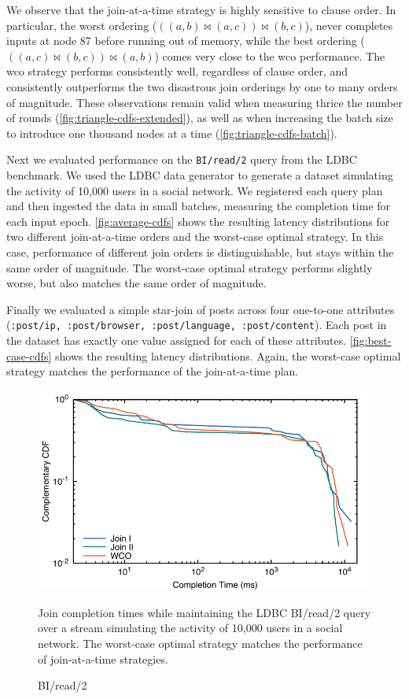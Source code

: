 \documentclass[../catalog.tex]{subfiles}
\begin{document}
We observe that the join-at-a-time strategy is highly sensitive to
clause order. In particular, the worst ordering ($((a,b) \bowtie
(a,c)) \bowtie (b,c)$), never completes inputs at node 87 before
running out of memory, while the best ordering ($((a,c) \bowtie (b,c))
\bowtie (a,b)$) comes very close to the wco performance. The wco
strategy performs consistently well, regardless of clause order, and
consistently outperforms the two disastrous join orderings by one to
many orders of magnitude. These observations remain valid when
measuring thrice the number of rounds
(\autoref{fig:triangle-cdfs-extended}), as well as when increasing the
batch size to introduce one thousand nodes at a time
(\autoref{fig:triangle-cdfs-batch}).

Next we evaluated performance on the \texttt{BI/read/2} query from the
LDBC benchmark. We used the LDBC data generator to generate a dataset
simulating the activity of 10,000 users in a social network. We
registered each query plan and then ingested the data in small
batches, measuring the completion time for each input
epoch. \autoref{fig:average-cdfs} shows the resulting latency
distributions for two different join-at-a-time orders and the
worst-case optimal strategy. In this case, performance of different
join orders is distinguishable, but stays within the same order of
magnitude. The worst-case optimal strategy performs slightly worse,
but also matches the same order of magnitude.

Finally we evaluated a simple star-join of posts across four
one-to-one attributes (\texttt{:post/ip, :post/browser,
  :post/language, :post/content}). Each post in the dataset has
exactly one value assigned for each of these
attributes. \autoref{fig:best-case-cdfs} shows the resulting latency
distributions. Again, the worst-case optimal strategy matches the
performance of the join-at-a-time plan.

\begin{figure}
  \centering
  \includegraphics[width=1.0\linewidth]{results/bi_read_2/out/all_cdfs}
  \caption{BI/read/2}
  \label{fig:average-cdfs}
  \medskip
  \small

  Join completion times while maintaining the LDBC BI/read/2 query
  over a stream simulating the activity of 10,000 users in a social
  network. The worst-case optimal strategy matches the performance of
  join-at-a-time strategies.
\end{figure}
\end{document}
